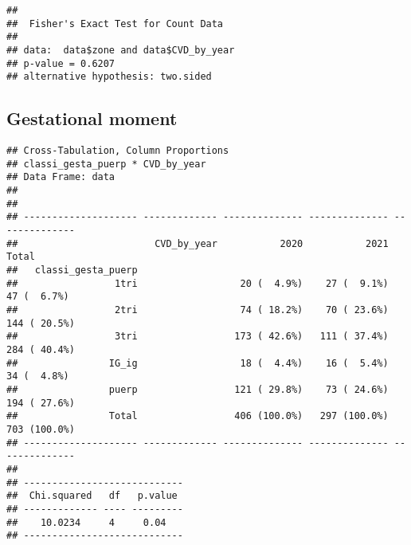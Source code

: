 \documentclass[
]{article}
\newenvironment{Shaded}{\begin{snugshade}}{\end{snugshade}}
\newcommand{\AttributeTok}[1]{\textcolor[rgb]{0.13,0.29,0.53}{#1}}
\newcommand{\ConstantTok}[1]{\textcolor[rgb]{0.56,0.35,0.01}{#1}}
\newcommand{\FunctionTok}[1]{\textcolor[rgb]{0.13,0.29,0.53}{\textbf{#1}}}
\newcommand{\NormalTok}[1]{#1}
\newcommand{\SpecialCharTok}[1]{\textcolor[rgb]{0.81,0.36,0.00}{\textbf{#1}}}
\newcommand{\StringTok}[1]{\textcolor[rgb]{0.31,0.60,0.02}{#1}}
\begin{document}
\begin{Shaded}
\end{Shaded}

\begin{verbatim}
## 
##  Fisher's Exact Test for Count Data
## 
## data:  data$zone and data$CVD_by_year
## p-value = 0.6207
## alternative hypothesis: two.sided
\end{verbatim}

\hypertarget{gestational-moment}{%
\subsection{Gestational moment}\label{gestational-moment}}

\begin{Shaded}
\end{Shaded}

\begin{verbatim}
## Cross-Tabulation, Column Proportions  
## classi_gesta_puerp * CVD_by_year  
## Data Frame: data  
## 
## 
## -------------------- ------------- -------------- -------------- --------------
##                        CVD_by_year           2020           2021          Total
##   classi_gesta_puerp                                                           
##                 1tri                  20 (  4.9%)    27 (  9.1%)    47 (  6.7%)
##                 2tri                  74 ( 18.2%)    70 ( 23.6%)   144 ( 20.5%)
##                 3tri                 173 ( 42.6%)   111 ( 37.4%)   284 ( 40.4%)
##                IG_ig                  18 (  4.4%)    16 (  5.4%)    34 (  4.8%)
##                puerp                 121 ( 29.8%)    73 ( 24.6%)   194 ( 27.6%)
##                Total                 406 (100.0%)   297 (100.0%)   703 (100.0%)
## -------------------- ------------- -------------- -------------- --------------
## 
## ----------------------------
##  Chi.squared   df   p.value 
## ------------- ---- ---------
##    10.0234     4     0.04   
## ----------------------------
\end{verbatim}
\end{document}
